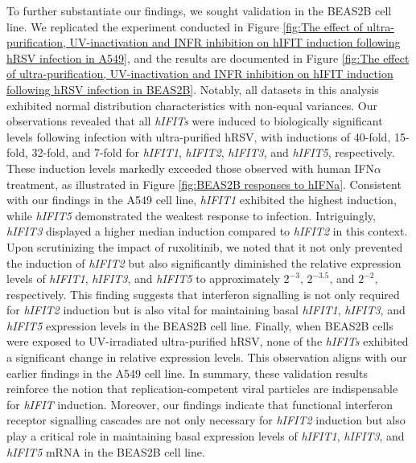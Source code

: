 To further substantiate our findings, we sought validation in the BEAS2B cell line. We replicated the experiment conducted in Figure \ref{fig:The effect of ultra-purification, UV-inactivation and INFR inhibition on hIFIT induction following hRSV infection in A549}, and the results are documented in Figure \ref{fig:The effect of ultra-purification, UV-inactivation and INFR inhibition on hIFIT induction following hRSV infection in BEAS2B}. Notably, all datasets in this analysis exhibited normal distribution characteristics with non-equal variances. Our observations revealed that all \textit{hIFITs} were induced to biologically significant levels following infection with ultra-purified hRSV, with inductions of 40-fold, 15-fold, 32-fold, and 7-fold for \textit{hIFIT1}, \textit{hIFIT2}, \textit{hIFIT3}, and \textit{hIFIT5}, respectively. These induction levels markedly exceeded those observed with human IFN\(\alpha\) treatment, as illustrated in Figure \ref{fig:BEAS2B responses to hIFNa}. Consistent with our findings in the A549 cell line, \textit{hIFIT1} exhibited the highest induction, while \textit{hIFIT5} demonstrated the weakest response to infection. Intriguingly, \textit{hIFIT3} displayed a higher median induction compared to \textit{hIFIT2} in this context. Upon scrutinizing the impact of ruxolitinib, we noted that it not only prevented the induction of \textit{hIFIT2} but also significantly diminished the relative expression levels of \textit{hIFIT1}, \textit{hIFIT3}, and \textit{hIFIT5} to approximately \(2^{-3}\), \(2^{-3.5}\), and \(2^{-2}\), respectively. This finding suggests that interferon signalling is not only required for \textit{hIFIT2} induction but is also vital for maintaining basal \textit{hIFIT1}, \textit{hIFIT3}, and \textit{hIFIT5} expression levels in the BEAS2B cell line. Finally, when BEAS2B cells were exposed to UV-irradiated ultra-purified hRSV, none of the \textit{hIFITs} exhibited a significant change in relative expression levels. This observation aligns with our earlier findings in the A549 cell line. In summary, these validation results reinforce the notion that replication-competent viral particles are indispensable for \textit{hIFIT} induction. Moreover, our findings indicate that functional interferon receptor signalling cascades are not only necessary for \textit{hIFIT2} induction but also play a critical role in maintaining basal expression levels of \textit{hIFIT1}, \textit{hIFIT3}, and \textit{hIFIT5} mRNA in the BEAS2B cell line.

